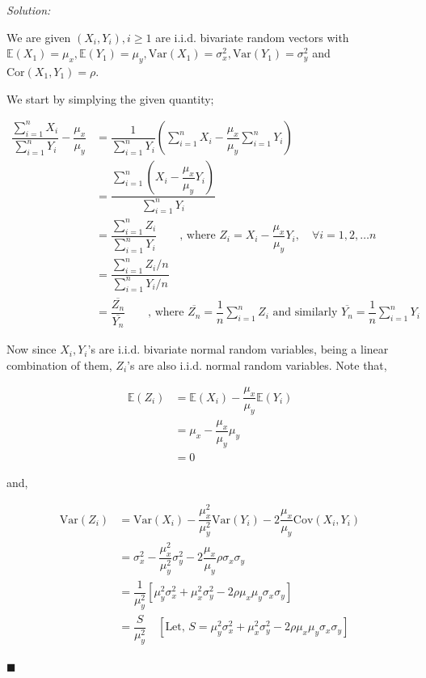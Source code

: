 \documentclass[12pt]{article}
\newcommand{\E}{\mathbb{E}}
\newcommand{\Var}{\text{Var}}
\newcommand{\corr}{\mathrm{Cor}}
\theoremstyle{definition}
\newenvironment{answer}{\textit{Solution: }\quad }{ \hfill $\blacksquare$}
\numberwithin{equation}{section}
\begin{document}
\begin{answer}

We are given $(X_i,Y_i),i\geq 1$ are i.i.d. bivariate random vectors with $\E(X_1)=\mu_x,\E(Y_1)=\mu_y,\Var(X_1)=\sigma_x^2,\Var(Y_1)=\sigma_y^2$ and $\corr(X_1,Y_1)=\rho$. 

We start by simplying the given quantity;

\begin{align*}
    \dfrac{\sum_{i=1}^n X_i}{\sum_{i=1}^n Y_i} - \dfrac{\mu_x}{\mu_y} 
    & =\dfrac{1}{\sum_{i=1}^n Y_i}\left( \sum_{i=1}^n X_i- \dfrac{\mu_x}{\mu_y} \sum_{i=1}^n Y_i \right)\\
    & =\dfrac{\sum_{i=1}^n\left(  X_i- \dfrac{\mu_x}{\mu_y} Y_i \right)}{\sum_{i=1}^n Y_i}\\
    & = \dfrac{\sum_{i=1}^{n} Z_i}{\sum_{i = 1}^{n} Y_i} \qquad \text{, where } Z_i =X_i- \dfrac{\mu_x}{\mu_y} Y_i, \quad \forall i = 1, 2, \dots n\\
    & = \dfrac{\sum_{i=1}^{n} Z_i / n}{\sum_{i=1}^{n} Y_i / n}\\
    & = \dfrac{\overline{Z_n}}{\overline{Y_n}} \qquad \text{, where } \overline{Z_n} = \dfrac{1}{n} \sum_{i=1}^n Z_i \text{ and similarly } \overline{Y_n} = \dfrac{1}{n} \sum_{i=1}^n Y_i
\end{align*}

Now since $X_i, Y_i$'s are i.i.d. bivariate normal random variables, being a linear combination of them, $Z_i$'s are also i.i.d. normal random variables. Note that,

\begin{align*}
    \E(Z_i) & = \E(X_i)- \dfrac{\mu_x}{\mu_y} \E(Y_i)\\
    & = \mu_x- \dfrac{\mu_x}{\mu_y} \mu_y\\
    & = 0
\end{align*}

and,

\begin{align*}
    \Var(Z_i)& =\Var(X_i)- \dfrac{\mu_x^2}{\mu_y^2} \Var(Y_i) - 2\dfrac{\mu_x}{\mu_y} \text{Cov}(X_i,Y_i)\\
    & = \sigma_x^2- \dfrac{\mu_x^2}{\mu_y^2} \sigma_y^2 - 2\dfrac{\mu_x}{\mu_y}\rho \sigma_x\sigma_y\\
    & = \dfrac{1}{\mu_y^2}\left[ \mu_y^2\sigma_x^2 + \mu_x^2\sigma_y^2 - 2\rho\mu_x\mu_y\sigma_x\sigma_y \right]\\
    & = \dfrac{S}{\mu_y^2}\quad \left[\text{Let, } S = \mu_y^2\sigma_x^2 + \mu_x^2\sigma_y^2 - 2\rho\mu_x\mu_y\sigma_x\sigma_y\right]
\end{align*}


\end{answer}
\end{document}
